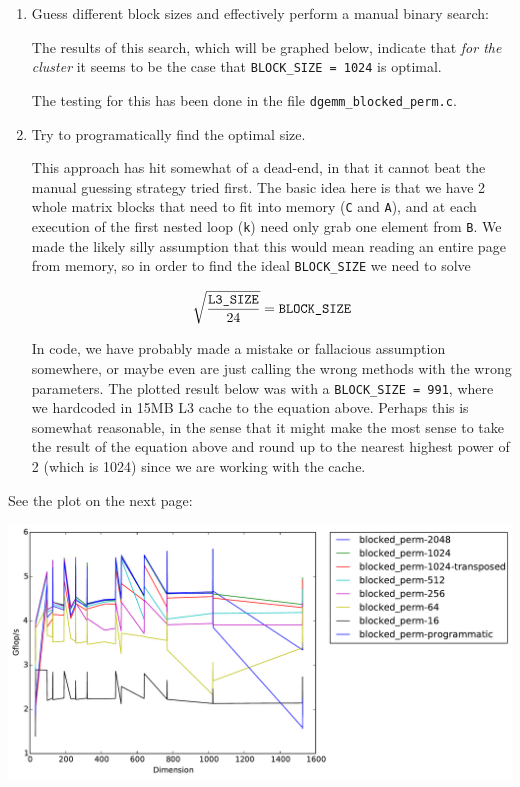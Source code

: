 \documentclass[11pt]{article}
\begin{document}
\begin{enumerate}
    \item Guess different block sizes and effectively perform a manual binary search:

    The results of this search, which will be graphed below, indicate that \emph{for the cluster} it seems to be the case that \texttt{BLOCK\_SIZE = 1024} is optimal.

    The testing for this has been done in the file \texttt{dgemm\_blocked\_perm.c}.

    \item Try to programatically find the optimal size.

    This approach has hit somewhat of a dead-end, in that it cannot beat the manual guessing strategy tried first.  The basic idea here is that we have 2 whole matrix blocks that need to fit into memory (\texttt{C} and \texttt{A}), and at each execution of the first nested loop (\texttt{k}) need only grab one element from \texttt{B}.  We made the likely silly assumption that this would mean reading an entire page from memory, so in order to find the ideal \texttt{BLOCK\_SIZE} we need to solve

    $$
    \sqrt{\frac{\text{\ttfamily L3\_SIZE}}{24}} = \text{\ttfamily BLOCK\_SIZE}
    $$

    In code, we have probably made a mistake or fallacious assumption somewhere, or maybe even are just calling the wrong methods with the wrong parameters.  The plotted result below was with a \texttt{BLOCK\_SIZE = 991}, where we hardcoded in 15MB L3 cache to the equation above.  Perhaps this is somewhat reasonable, in the sense that it might make the most sense to take the result of the equation above and round up to the nearest highest power of 2 (which is 1024) since we are working with the cache. 
\end{enumerate}

\noindent See the plot on the next page:
\newpage
\begin{center}
    \includegraphics[scale=0.5]{benchmarking/blocked/timing.pdf}
\end{center}
\end{document}
